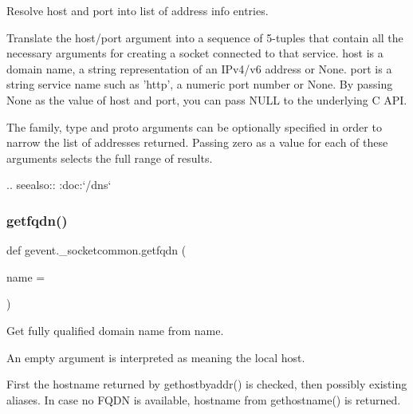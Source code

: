 \begin{DoxyVerb}Resolve host and port into list of address info entries.

Translate the host/port argument into a sequence of 5-tuples that contain
all the necessary arguments for creating a socket connected to that service.
host is a domain name, a string representation of an IPv4/v6 address or
None. port is a string service name such as 'http', a numeric port number or
None. By passing None as the value of host and port, you can pass NULL to
the underlying C API.

The family, type and proto arguments can be optionally specified in order to
narrow the list of addresses returned. Passing zero as a value for each of
these arguments selects the full range of results.

.. seealso:: :doc:`/dns`
\end{DoxyVerb}
 \mbox{\label{namespacegevent_1_1__socketcommon_a9cc84a90b58f69fdb4b378af2c174a40}} 
\subsubsection{\texorpdfstring{getfqdn()}{getfqdn()}}
{\footnotesize\ttfamily def gevent.\+\_\+socketcommon.\+getfqdn (\begin{DoxyParamCaption}\item[{}]{name = {\ttfamily \textquotesingle{}\textquotesingle{}} }\end{DoxyParamCaption})}

\begin{DoxyVerb}Get fully qualified domain name from name.

An empty argument is interpreted as meaning the local host.

First the hostname returned by gethostbyaddr() is checked, then
possibly existing aliases. In case no FQDN is available, hostname
from gethostname() is returned.
\end{DoxyVerb}
 \mbox{\label{namespacegevent_1_1__socketcommon_a9fc88bc23729e5962781f8a89b11016a}} 
